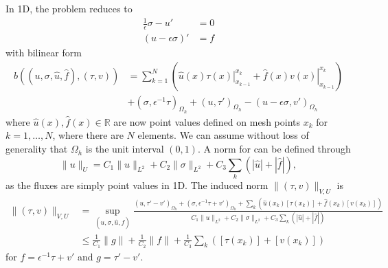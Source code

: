 \documentclass[11pt,onecolumn]{scrartcl}
\begin{document}
In 1D, the problem reduces to 
\begin{align*}
\frac{1}{\epsilon}\sigma - u' &= 0\\
\left(u - \epsilon \sigma \right)' &=f
\end{align*}
with bilinear form
\begin{align*}
b\left(\left(u,\sigma,\widehat{u},\widehat{f}\right),\left(\tau,v\right)\right) &= \sum_{k=1}^N \left(\left.\widehat{u}(x) \tau(x)\right |^{x_k}_{x_{k-1}} + \left.\widehat{f}(x) v(x)\right |^{x_k}_{x_{k-1}}\right) \\
&+ \left(\sigma,\epsilon^{-1}\tau\right)_{\Omega_h} + (u,\tau')_{\Omega_h}- \left(u - \epsilon \sigma,v'\right)_{\Omega_h}
\end{align*}
where $\widehat{u}(x), \widehat{f}(x) \in \mathbb{R}$ are now point values defined on mesh points $x_k$ for $k=1,\ldots,N$, where there are $N$ elements.  We can assume without loss of generality that $\Omega_h$ is the unit interval $(0,1)$.  A norm for can be defined through $$\|u\|_U = C_1\|u\|_{L^2} + C_2\|\sigma\|_{L^2} + C_3\sum_k \left(|\widehat{u}|+ |\widehat{f}|\right),$$ as the fluxes are simply point values in 1D.  
The induced norm $\|\left(\tau,v\right)\|_{V,U}$ is
\begin{align*}
\|\left(\tau,v\right)\|_{V,U} &= \sup_{\left(u,\sigma,\widehat{u},\widehat{f}\right)} \frac{ (u,\tau'-v')_{\Omega_h}+ \left(\sigma,\epsilon^{-1}\tau + v'\right)_{\Omega_h}+\sum_k \left(\widehat{u}(x_k) [\tau(x_k)] + \widehat{f}(x_k) [v(x_k)]\right)}{C_1\|u\|_{L^2} + C_2\|\sigma\|_{L^2} + C_3\sum_k \left(|\widehat{u}|+ |\widehat{f}|\right)}\\
&\leq \frac{1}{C_1}\|g\| + \frac{1}{C_2}\|f\| + \frac{1}{C_3}\sum_k \left([\tau(x_k)] +[v(x_k)]\right)
\end{align*}
for $f = \epsilon^{-1}\tau + v'$ and $g = \tau'-v'$.
\end{document}
